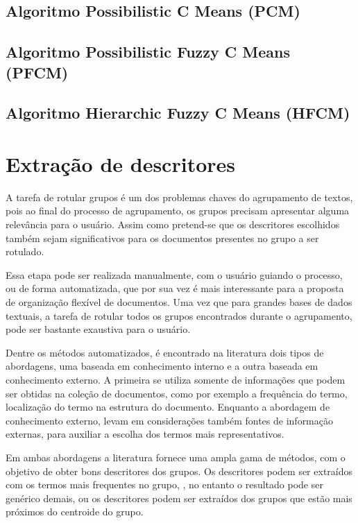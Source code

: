  


\subsection{Algoritmo Possibilistic C Means (PCM)}
\subsection{Algoritmo Possibilistic Fuzzy C Means (PFCM)}
\subsection{Algoritmo Hierarchic Fuzzy C Means (HFCM)}

\section{Extração de descritores}

A tarefa de rotular grupos é um dos problemas chaves do agrupamento de textos, 
pois ao final do processo de agrupamento, os grupos precisam apresentar alguma relevância para 
o usuário\cite{Zhang2008}. Assim como pretend-se que os descritores escolhidos também sejam 
significativos para os documentos presentes no grupo a ser rotulado. 

Essa etapa pode ser realizada manualmente, com o usuário guiando o processo, ou de forma 
automatizada, que por sua vez é mais interessante para a proposta de organização flexível de 
documentos. Uma vez que para grandes bases de dados textuais, a tarefa de rotular todos os grupos
encontrados durante o agrupamento, pode ser bastante exaustiva para o usuário.

Dentre os métodos automatizados, é encontrado na literatura dois tipos de abordagens, uma 
baseada em conhecimento interno e a outra baseada em conhecimento externo\cite{Nogueira2013}. 
A primeira se utiliza somente de informações que podem ser obtidas na coleção de documentos, 
como por exemplo a frequência do termo, localização do termo na estrutura do documento.
Enquanto a abordagem de conhecimento externo, levam em considerações também fontes de informação
externas, para auxiliar a escolha dos termos mais representativos. 

Em ambas abordagens a literatura fornece uma ampla gama de métodos, com o objetivo de obter bons
descritores dos grupos. Os descritores podem ser extraídos com os termos mais frequentes no grupo,
, no entanto o resultado pode ser genérico demais\cite{Pucktada2006}, ou os descritores podem
ser extraídos dos grupos que estão mais próximos do centroide do grupo.


